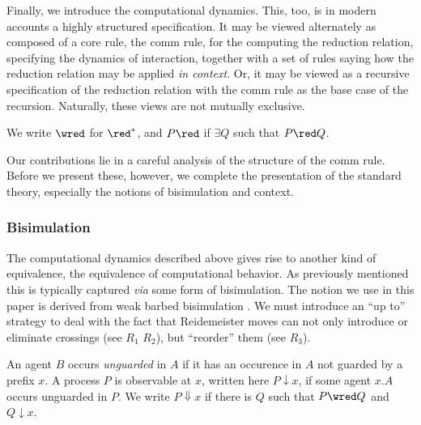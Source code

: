 Finally, we introduce the computational dynamics. This, too, is in
modern accounts a highly structured specification. It may be viewed
alternately as composed of a core rule, the comm rule, for the
computing the reduction relation, specifying the dynamics of
interaction, together with a set of rules saying how the reduction
relation may be applied \emph{in context}. Or, it may be viewed as a
recursive specification of the reduction relation with the comm rule
as the base case of the recursion. Naturally, these views are not
mutually exclusive.


We write $\wred$ for $\red^*$, and $P\red$ if $\exists Q $ such that $ P \red Q$.

Our contributions lie in a careful analysis of the structure of the
comm rule. Before we present these, however, we complete the
presentation of the standard theory, especially the notions of
bisimulation and context.

\subsubsection{Bisimulation}

The computational dynamics described above gives rise to another kind
of equivalence, the equivalence of computational behavior. As
previously mentioned this is typically captured \emph{via} some form
of bisimulation. The notion we use in this paper is derived from weak
barbed bisimulation \cite{milner91polyadicpi}. We must introduce an
``up to'' \cite{DBLP:conf/concur/SangiorgiM92}
\cite{DBLP:conf/concur/Pous06} strategy to deal with the fact that
Reidemeister moves can not only introduce or eliminate crossings (see
$R_1$ $R_2$), but ``reorder'' them (see $R_3$).

\begin{definition}
  An agent $B$ occurs \emph{unguarded} in $A$ if it has an occurence
  in $A$ not guarded by a prefix $x$. A process $P$ is observable at
  $x$, written here $P \downarrow x$, if some agent $x.A$ occurs
  unguarded in $P$. We write $P \Downarrow x$ if there is $Q$ such
  that $P \wred Q$ and $Q \downarrow x$.
\end{definition}

